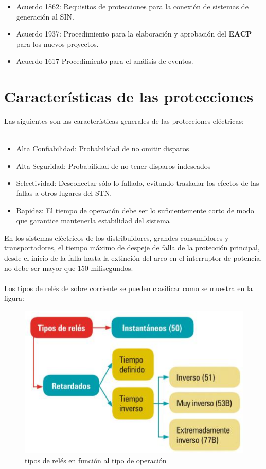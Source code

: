 \documentclass[a5paper]{book}%
\begin{document}
    \begin{itemize}
    	\item Acuerdo 1862: Requisitos de protecciones para la conexión de sistemas de generación al SIN.
    	\item Acuerdo 1937: Procedimiento para la elaboración  y aprobación  del \textbf{EACP} para los nuevos proyectos.
    	\item  Acuerdo 1617 Procedimiento para el análisis de eventos.
    \end{itemize}
    
\section{Características de las protecciones}
Las siguientes son las características generales de las protecciones eléctricas:\\\\
\begin{itemize}
	\item Alta Confiabilidad: Probabilidad de no omitir disparos
	\item Alta Seguridad: Probabilidad de no tener disparos indeseados
	\item Selectividad: Desconectar sólo lo fallado, evitando trasladar los efectos de las fallas a otros lugares del STN. 
	\item Rapidez: El tiempo de operación debe ser lo suficientemente corto de modo que garantice mantenerla estabilidad del sistema
\end{itemize}

En los sistemas eléctricos de los distribuidores, grandes consumidores y transportadores, el tiempo máximo de despeje de falla de la protección principal, desde el inicio de la falla hasta la extinción del arco en el interruptor de potencia, no debe
ser mayor que 150 milisegundos.\\\\

Los tipos de relés de sobre corriente se pueden clasificar como se muestra en la figura:

\begin{figure}[H]
	\centering
	
	\caption{tipos de relés en función al tipo de operación}
	\label{fig:tiporele}
	\includegraphics[width=\linewidth]{tipos_rele}
\end{figure}
\end{document}
